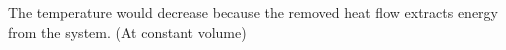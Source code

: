 The temperature would decrease because the removed heat flow extracts energy from the system. (At constant volume)